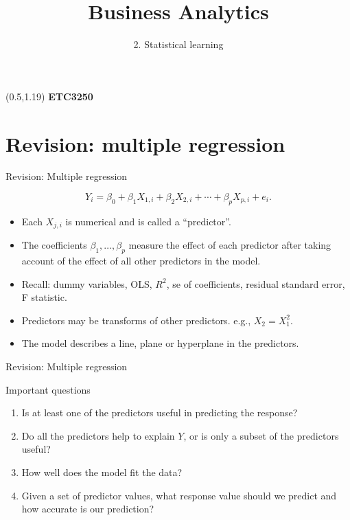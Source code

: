 \documentclass[14pt]{beamer}
\title[2. Statistical learning]{Business Analytics}
\author{2. Statistical learning}
\makeatletter
\def\biz{\begin{itemize}[<+-| alert@+>]}
\def\eiz{\end{itemize}}
\makeatother
\begin{document}
\begin{frame}[plain]{}
\maketitle
\begin{textblock}{11}(0.5,1.19){\color{white}\large
\textbf{ETC3250}}
\end{textblock}
\end{frame}

\section{Revision: multiple regression}


\begin{frame}{Revision: Multiple regression}

\begin{block}{}\vspace*{-0.2cm}
$$Y_i = \beta_0 + \beta_1 X_{1,i} + \beta_2 X_{2,i} + \cdots + \beta_pX_{p,i} + e_i.$$
\end{block}
\biz
\item Each $X_{j,i}$ is numerical and is called a ``predictor''.

\item The coefficients $\beta_1,\dots,\beta_p$ measure the effect of each
predictor after taking account of the effect of all other predictors
in the model.

\item Recall: dummy variables, OLS, $R^2$, se of coefficients, residual standard error, F statistic.

\item Predictors may be transforms of other predictors. e.g., $X_2=X_1^2$.

\item The model describes a line, plane or hyperplane in the predictors.

\eiz

\end{frame}

\begin{frame}{Revision: Multiple regression}
\end{frame}


\begin{frame}{Important questions}\large 
\begin{enumerate}
\item Is at least one of the predictors useful in predicting the response?

\item Do all the predictors help to explain $Y$, or is only a subset of the predictors useful?

\item How well does the model fit the data?

\item Given a set of predictor values, what response value should we predict and how accurate is our prediction?

\end{enumerate}

\end{frame}
\end{document}
